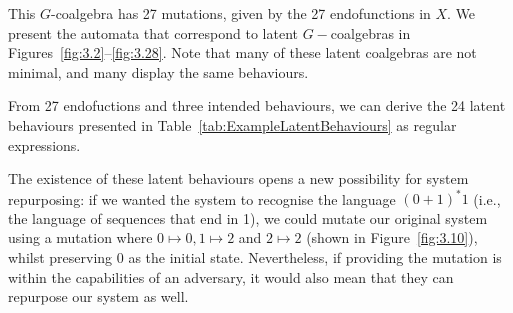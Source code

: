 \begin{example}
This $G$-coalgebra has 27 mutations, given by the 27 endofunctions in $X$. We present the automata that correspond to latent $G-$coalgebras in Figures~\ref{fig:3.2}--\ref{fig:3.28}. Note that many of these latent coalgebras are not minimal, and many display the same behaviours.

From 27 endofuctions and three intended behaviours, we can derive the 24 latent behaviours presented in Table~\ref{tab:ExampleLatentBehaviours} as regular expressions. 

The existence of these latent behaviours opens a new possibility for system repurposing: if we wanted the system to recognise the language $(0+1)^*1$ (i.e., the language of sequences that end in 1), we could mutate our original system using a mutation where $0\mapsto0, 1\mapsto2$ and $2\mapsto2$ (shown in Figure~\ref{fig:3.10}), whilst preserving $0$ as the initial state. Nevertheless, if providing the mutation is within the capabilities of an adversary, it would also mean that they can repurpose our system as well. 


\end{example}
